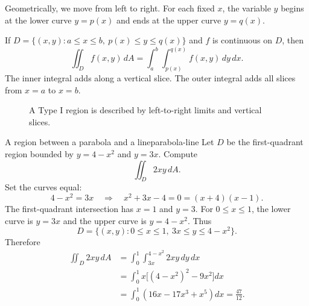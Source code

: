 \documentclass[11pt]{article}
\begin{document}
Geometrically, we move from left to right. For each fixed $x$, the variable $y$ begins at the lower curve $y=p(x)$ and ends at the upper curve $y=q(x)$.

\begin{importantbox}
If $D=\{(x,y):a\le x\le b,\ p(x)\le y\le q(x)\}$ and $f$ is continuous on $D$, then
\[
\iint_D f(x,y)\,dA=\int_a^b\int_{p(x)}^{q(x)}f(x,y)\,dy\,dx.
\]
The inner integral adds along a vertical slice. The outer integral adds all slices from $x=a$ to $x=b$.
\end{importantbox}

\begin{figure}[H]
\centering
{}
\caption{A Type I region is described by left-to-right limits and vertical slices.}
\end{figure}

\begin{examplebox}{A region between a parabola and a line}{parabola-line}
Let $D$ be the first-quadrant region bounded by $y=4-x^2$ and $y=3x$. Compute
\[
\iint_D 2xy\,dA.
\]
Set the curves equal:
\[
4-x^2=3x\quad\Longrightarrow\quad x^2+3x-4=0=(x+4)(x-1).
\]
The first-quadrant intersection has $x=1$ and $y=3$. For $0\le x\le 1$, the lower curve is $y=3x$ and the upper curve is $y=4-x^2$. Thus
\[
D=\{(x,y):0\le x\le 1,\ 3x\le y\le 4-x^2\}.
\]
Therefore
\[
\begin{aligned}
\iint_D 2xy\,dA
&=\int_0^1\int_{3x}^{4-x^2}2xy\,dy\,dx \\
&=\int_0^1 x\big[(4-x^2)^2-9x^2\big]dx \\
&=\int_0^1(16x-17x^3+x^5)dx
=\frac{47}{12}.
\end{aligned}
\]
\end{examplebox}
\end{document}
